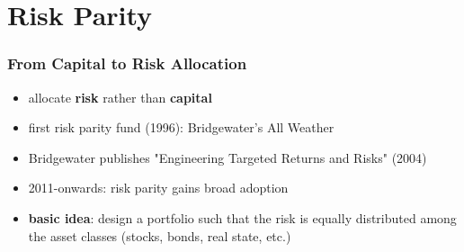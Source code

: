 \documentclass[aspectratio=169]{beamer}
\begin{document}
	\setcounter{showSlideNumbers}{0}
        \section{Risk Parity}
	\setcounter{framenumber}{1}
	\setcounter{showSlideNumbers}{1}

		\begin{frame}
			\frametitle{From Capital to Risk Allocation}
			\begin{itemize}
                          \item allocate \textbf{risk} rather than \textbf{capital} \vspace{.5cm}
                            \pause
                                \item first risk parity fund (1996): Bridgewater's All Weather \vspace{.5cm}
                            \pause
                                \item Bridgewater publishes "Engineering Targeted Returns and Risks" (2004) \vspace{.5cm}
                            \pause
                                \item 2011-onwards: risk parity gains broad adoption \vspace{.5cm}
                            \pause
                                \item \textbf{basic idea}: design a portfolio such that the risk is equally distributed among the asset classes (stocks, bonds, real state,
                                  etc.)
			\end{itemize}
		\end{frame}
\end{document}
